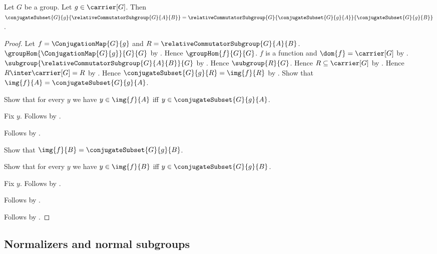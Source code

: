 \begin{theorem}\label{relative_commutator_subgroup_conjugate}
    Let $G$ be a group.
    Let $g\in\carrier[G]$.
    Then
        $\conjugateSubset{G}{g}{
            \relativeCommutatorSubgroup{G}{A}{B}}=
          \relativeCommutatorSubgroup{G}
            {\conjugateSubset{G}{g}{A}}
            {\conjugateSubset{G}{g}{B}}$.
\end{theorem}
\begin{proof}
    Let $f=\ConjugationMap{G}{g}$ and
        $R=\relativeCommutatorSubgroup{G}{A}{B}$.
    $\groupHom{\ConjugationMap{G}{g}}{G}{G}$ by
        .
    Hence $\groupHom{f}{G}{G}$.
    $f$ is a function and $\dom{f}=\carrier[G]$ by
        .
    $\subgroup{\relativeCommutatorSubgroup{G}{A}{B}}{G}$ by
        .
    Hence $\subgroup{R}{G}$.
    Hence $R\subseteq\carrier[G]$ by .
    Hence $R\inter\carrier[G]=R$ by
        .
    Hence $\conjugateSubset{G}{g}{R}=\img{f}{R}$ by
        .
    Show that $\img{f}{A}=\conjugateSubset{G}{g}{A}$.
    \begin{subproof}
        Show that for every $y$ we have
            $y\in\img{f}{A}$ iff
            $y\in\conjugateSubset{G}{g}{A}$.
        \begin{subproof}
            Fix $y$.
            Follows by
                .
        \end{subproof}
        Follows by .
    \end{subproof}
    Show that $\img{f}{B}=\conjugateSubset{G}{g}{B}$.
    \begin{subproof}
        Show that for every $y$ we have
            $y\in\img{f}{B}$ iff
            $y\in\conjugateSubset{G}{g}{B}$.
        \begin{subproof}
            Fix $y$.
            Follows by
                .
        \end{subproof}
        Follows by .
    \end{subproof}
    Follows by
        .
\end{proof}

\subsection{Normalizers and normal subgroups}


